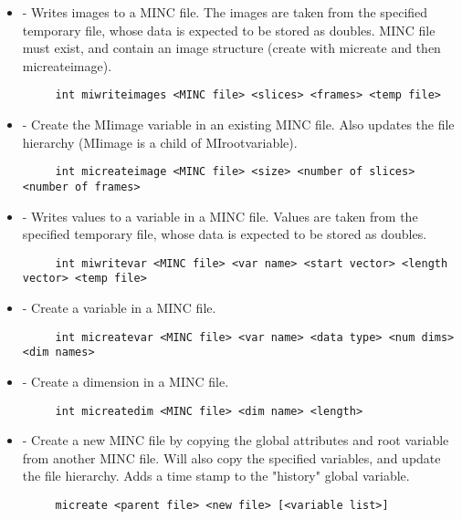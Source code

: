 \begin {itemize}

\item {} - Writes images to a MINC file.  The images
are taken from the specified temporary file, whose data is expected to
be stored as doubles.  MINC file must exist, and contain an image
structure (create with micreate and then micreateimage).
\begin{verbatim}
     int miwriteimages <MINC file> <slices> <frames> <temp file>
\end{verbatim}

\item {} - Create the MIimage variable in an existing MINC file.
    Also updates the file hierarchy (MIimage is a child of MIrootvariable).
\begin{verbatim}
     int micreateimage <MINC file> <size> <number of slices> <number of frames>
\end{verbatim}

\item {} - Writes values to a variable in a MINC file.  Values are
    taken from the specified temporary file, whose data is
    expected to be stored as doubles.
\begin{verbatim}
     int miwritevar <MINC file> <var name> <start vector> <length vector> <temp file>
\end{verbatim}

\item {} - Create a variable in a MINC file.
\begin{verbatim}
     int micreatevar <MINC file> <var name> <data type> <num dims> <dim names>
\end{verbatim}

\item {} - Create a dimension in a MINC file.
\begin{verbatim}
     int micreatedim <MINC file> <dim name> <length>
\end{verbatim}


\item {} - Create a new MINC file by copying the global attributes
    and root variable from another MINC file.  Will also copy 
    the specified variables, and update the file hierarchy.  Adds 
    a time stamp to the "history" global variable.
\begin{verbatim}
     micreate <parent file> <new file> [<variable list>]
\end{verbatim}

\end{itemize}


